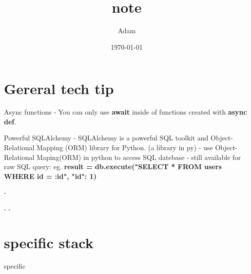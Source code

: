 \documentclass[12pt]{article}
\title{note}
\author{Adam}
\date{\today}
\begin{document}
\maketitle

\section{Gereral tech tip}
\large{Async functions}
- You can only use \textbf{await} inside of functions created with \textbf{async def}.

\large{Powerful SQLAlchemy}
- SQLAlchemy is a powerful SQL toolkit and Object-Relational Mapping (ORM) library for Python. (a library in py)
- use Object-Relational Maping(ORM) in python to access SQL datebase 
- still available for raw SQL query: 
eg.  \textbf{ result = db.execute("SELECT * FROM users WHERE id = :id", {"id": 1}) }

\large{}
- 

\large{}
- 
\large{}
- 

\section{specific stack}
specific
\end{document}
